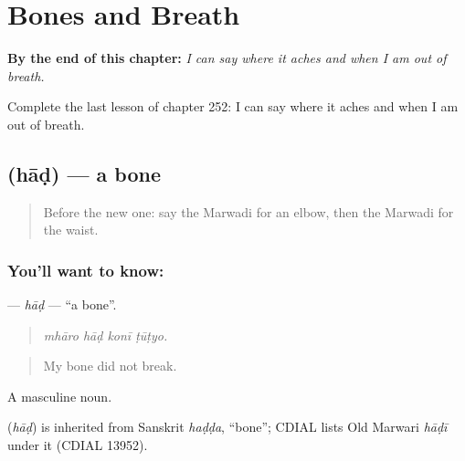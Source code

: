 
\chapter{Bones and Breath}
\label{ch:mw-bones-and-breath}

\begin{chapteropening}
\textbf{By the end of this chapter:} \emph{I can say where it aches and when I am out of breath.}

Complete the last lesson of chapter 252: I can say where it aches and when I am out of breath.
\end{chapteropening}

\section[\texorpdfstring{\mw{हाड} (hāḍ)}{हाड (hāḍ)}]{ (hāḍ) — a bone}

\label{lesson:MW-C252-had}



\begin{quote}
Before the new one: say the Marwadi for an elbow, then the Marwadi for the waist.
\end{quote}

\subsection*{You'll want to know: }
\textbf{} — \emph{hāḍ} — \textquotedblleft{}a bone\textquotedblright{}.

\begin{quote}
   
\end{quote}

\begin{quote}
\emph{mhāro hāḍ konī ṭūṭyo.}
\end{quote}

\begin{quote}
My bone did not break.
\end{quote}

A masculine noun.

\begin{cousinweb}
\textbf{} (\emph{hāḍ}) is inherited from Sanskrit \emph{haḍḍa}, \textquotedblleft{}bone\textquotedblright{}; CDIAL lists Old Marwari \emph{hāḍī} under it (CDIAL 13952).
\end{cousinweb}

